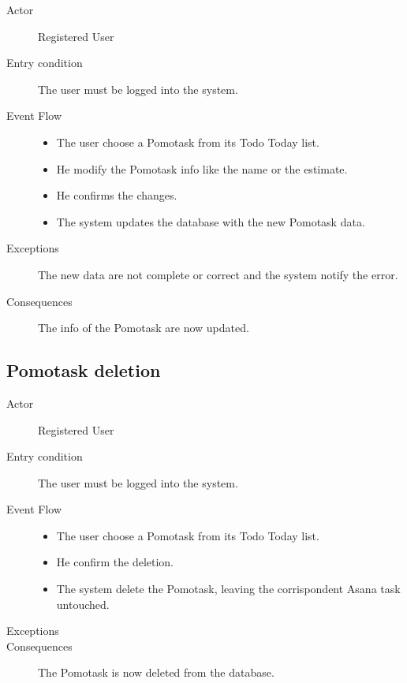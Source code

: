 			\begin{description}

				\item[Actor] Registered User
			
				\item[Entry condition] The user must be logged into the system.

				\item[Event Flow]\hfill

					\begin{itemize}

						\item The user choose a Pomotask from its Todo Today list.

						\item He modify the Pomotask info like the name or the estimate.

						\item He confirms the changes. 

						\item The system updates the database with the new Pomotask data.

					\end{itemize}

				\item[Exceptions] The new data are not complete or correct and the system notify the error.

				\item[Consequences] The info of the Pomotask are now updated.

			\end{description}

		\subsection{Pomotask deletion}

			\begin{description}

				\item[Actor] Registered User
			
				\item[Entry condition] The user must be logged into the system.

				\item[Event Flow]\hfill

					\begin{itemize}

						\item The user choose a Pomotask from its Todo Today list.

						\item He confirm the deletion.

						\item The system delete the Pomotask, leaving the corrispondent Asana task untouched.

					\end{itemize}

				\item[Exceptions]

				\item[Consequences] The Pomotask is now deleted from the database.

			\end{description}

